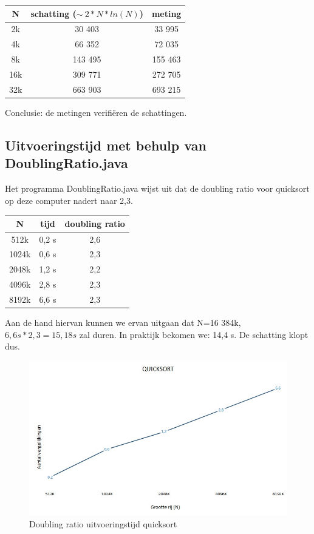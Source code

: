 \documentclass{article}
\begin{document}
\centering{}
\begin{tabular}{| c | c | c |}
\hline
  N & schatting ($\sim\ 2*N*ln(N)$) & meting \\
  \hline
  2k & 30 403 & 33 995 \\
  \hline
  4k & 66 352 & 72 035 \\
  \hline
  8k & 143 495 & 155 463 \\
  \hline
  16k & 309 771 & 272 705 \\
  \hline
  32k & 663 903 & 693 215 \\
  \hline
\end{tabular}

\raggedright
Conclusie: de metingen verifiëren de schattingen.
\newpage
\subsection{Uitvoeringstijd met behulp van DoublingRatio.java}
Het programma DoublingRatio.java wijst uit dat de doubling ratio voor quicksort op deze computer nadert naar 2,3.

\centering{}
\begin{tabular}{| c | c | c |}
\hline
  N & tijd & doubling ratio \\
  \hline
  512k & 0,2 s & 2,6 \\
  \hline
1024k & 0,6 s & 2,3 \\
\hline
2048k & 1,2 s & 2,2 \\
\hline
4096k & 2,8 s & 2,3 \\
\hline
8192k & 6,6 s & 2,3 \\
  \hline
\end{tabular}

\raggedright
Aan de hand hiervan kunnen we ervan uitgaan dat N=16 384k, $ 6,6 s * 2,3 = 15,18 s $ zal duren. In praktijk bekomen we: 14,4 s. De schatting klopt dus.

\begin{figure}[h!]
\centering
\includegraphics[scale=0.75]{ratio_quick.jpg}
\caption{Doubling ratio uitvoeringstijd quicksort}
\label{fig:ratio_quick}
\end{figure}
\end{document}
